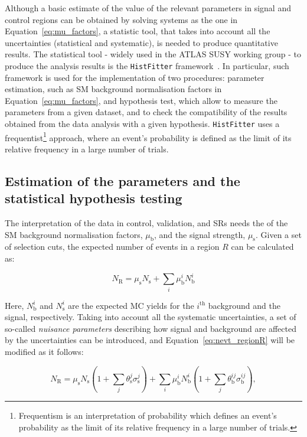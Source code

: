 		Although a basic estimate of the value of the relevant parameters in signal and control regions can be obtained by solving systems as the one in Equation~\ref{eq:mu_factors}, a statistic tool, that takes into account all the uncertainties (statistical and systematic), is needed to produce quantitative results. The statistical tool - widely used in the ATLAS SUSY working group - to produce the analysis results is the \texttt{HistFitter} framework~\cite{histfitter}. In particular, such framework is used for the implementation of two procedures: parameter estimation, such as \ac{SM} background normalisation factors in Equation~\ref{eq:mu_factors}, and hypothesis test, which allow to measure the parameters from a given dataset, and to check the compatibility of the results obtained from the data analysis with a given hypothesis. \texttt{HistFitter} uses a frequentist\footnote{Frequentism is an interpretation of probability which defines an event's probability as the limit of its relative frequency in a large number of trials.} approach, where an event's probability is defined as the limit of its relative frequency in a large number of trials.

		\subsection{Estimation of the parameters and the statistical hypothesis testing}

			The interpretation of the data in control, validation, and \acp{SR} needs the of the \ac{SM} background normalisation factors, $\mu_\mathrm{b}$, and the signal strength, $\mu_\mathrm{s}$. Given a set of selection cuts, the expected number of events in a region $R$ can be calculated as: 

			\begin{equation}
				N_{\mathrm{R}} = \mu_\mathrm{s} N_{\mathrm{s}} + \sum_i \mu_\mathrm{b}^i N_{\mathrm{b}}^i
			\label{eq:nevt_regionR}
			\end{equation}

			\noindent Here, $N_{\mathrm{b}}^i$ and $N_{\mathrm{s}}^i$ are the expected \ac{MC} yields for the $i^{\mathrm{th}}$ background and the signal, respectively. Taking into account all the systematic uncertainties, a set of so-called \emph{nuisance parameters} describing how signal and background are affected by the uncertainties can be introduced, and Equation~\ref{eq:nevt_regionR} will be modified as it follows:

			\begin{equation} 
				N_{\mathrm{R}} = \mu_\mathrm{s} N_{\mathrm{s}} \left ( 1 + \sum_j \theta_\mathrm{s}^j \sigma_\mathrm{s}^j \right ) + \sum_i \mu_\mathrm{b}^i N_{\mathrm{b}}^i \left ( 1 + \sum_j \theta_\mathrm{b}^{ij} \sigma_\mathrm{b}^{ij} \right ),
			\label{eq:nevt_regionR_nuisance}
			\end{equation} 

